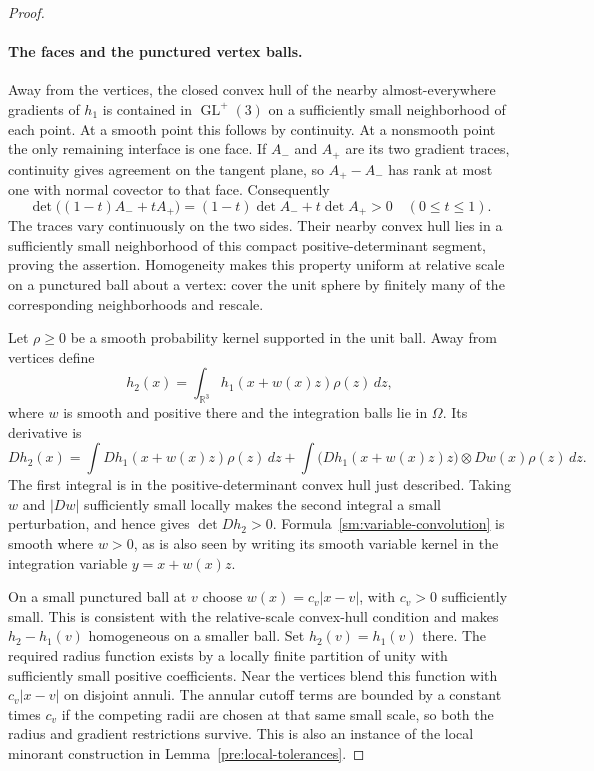 \documentclass[11pt]{article}
\numberwithin{equation}{section}
\theoremstyle{definition}
\theoremstyle{remark}
\begin{document}
\begin{proof}
\paragraph{The faces and the punctured vertex balls.}
Away from the vertices, the closed convex hull of the nearby
almost-everywhere gradients of $h_1$ is contained in
$\operatorname{GL}^+(3)$ on a sufficiently small neighborhood of each point.
At a smooth point this follows by continuity.  At a nonsmooth
point the only remaining interface is one face.  If $A_-$ and
$A_+$ are its two gradient traces, continuity gives agreement on
the tangent plane, so $A_+-A_-$ has rank at most one with normal
covector to that face.  Consequently
\begin{equation}
 \label{sm:face-segment}
 \det\bigl((1-t)A_-+tA_+\bigr)
 =(1-t)\det A_-+t\det A_+>0\quad(0\le t\le1).
\end{equation}
The traces vary continuously on the two sides.  Their nearby
convex hull lies in a sufficiently small neighborhood of this
compact positive-determinant segment, proving the assertion.
Homogeneity makes this property uniform at relative scale on
a punctured ball about a vertex: cover the unit sphere by finitely
many of the corresponding neighborhoods and rescale.

Let $\rho\ge0$ be a smooth probability kernel supported in the
unit ball.  Away from vertices define
\begin{equation}
 \label{sm:variable-convolution}
 h_2(x)=\int_{\mathbb R^3}h_1(x+w(x)z)\rho(z)\,dz,
\end{equation}
where $w$ is smooth and positive there and the integration balls
lie in $\Omega$.  Its derivative is
\begin{equation}
 \label{sm:variable-convolution-derivative}
 Dh_2(x)=\int Dh_1(x+w(x)z)\rho(z)\,dz
 +\int \bigl(Dh_1(x+w(x)z)z\bigr)\otimes Dw(x)\rho(z)\,dz.
\end{equation}
The first integral is in the positive-determinant convex hull just
described.  Taking $w$ and $|Dw|$ sufficiently small locally makes
the second integral a small perturbation, and hence gives
$\det Dh_2>0$.  Formula~\eqref{sm:variable-convolution} is smooth
where $w>0$, as is also seen by writing its smooth variable kernel
in the integration variable $y=x+w(x)z$.

On a small punctured ball at $v$ choose
$w(x)=c_v|x-v|$, with $c_v>0$ sufficiently small.  This is
consistent with the relative-scale convex-hull condition and
makes $h_2-h_1(v)$ homogeneous on a smaller ball.  Set
$h_2(v)=h_1(v)$ there.  The required radius function exists by
a locally finite partition of unity with sufficiently small
positive coefficients.  Near the vertices blend this function
with $c_v|x-v|$ on disjoint annuli.  The annular cutoff terms
are bounded by a constant times $c_v$ if the competing radii
are chosen at that same small scale, so both the radius and
gradient restrictions survive.  This is also an instance of
the local minorant construction in Lemma~\ref{pre:local-tolerances}.


\end{proof}
\end{document}
